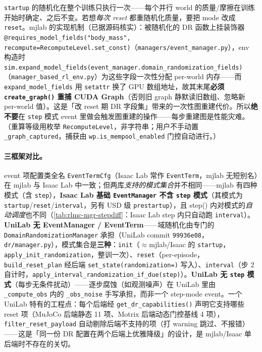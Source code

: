 \begin{insight}\label{ins:rlmc-mgr-startup}
\verb|startup| 的随机化在整个训练只执行一次——每个并行 world 的质量/摩擦在训练开始时确定、之后不变。若想\emph{每次 reset} 都重随机化质量，要把 mode 改成 \verb|reset|。mjlab 的实现机制（已据源码核实）：被随机化的 DR 函数上挂装饰器 \verb|@requires_model_fields("body_mass", recompute=RecomputeLevel.set_const)|（\texttt{managers/event\_manager.py}），env 构造时 \verb|sim.expand_model_fields(event_manager.domain_randomization_fields)|（\texttt{manager\_based\_rl\_env.py}）为这些字段一次性分配 per-world 内存——而 \verb|expand_model_fields| 用 \verb|setattr| 换了 GPU 数组地址，故其末尾\textbf{必须 \texttt{create\_graph()} 重捕 CUDA Graph}（否则旧 graph 静默读旧数组、忽略新 per-world 值）。这是「改 reset 期 DR 字段集」带来的一次性图重建代价。所以\textbf{绝不要}在 \verb|step| 模式 event 里做会触发图重建的操作——每步重建图是性能灾难。（重算等级用枚举 \verb|RecomputeLevel|，非字符串；用户不手动置 \verb|_graph_captured|，捕获由 \verb|wp.is_mempool_enabled| 门控自动进行。）
\end{insight}

\paragraph{三框架对比。}event 项配置类全名 \verb|EventTermCfg|（Isaac Lab 常作 \verb|EventTerm|，mjlab 无短别名）在 mjlab 与 Isaac Lab 中一致；但两库\emph{支持的模式集合}并不相同——mjlab 有四种模式（含 \verb|step|），\textbf{Isaac Lab 基础 \texttt{EventManager} 不含 \texttt{step} 模式}（其模式为 \verb|startup|/\verb|reset|/\verb|interval|，另有 USD 级 \verb|prestartup|），且 step() 内对模式的\emph{自动调度}也不同（\cref{tab:rlmc-mgr-stepdiff}：Isaac Lab step 内只自动跑 \verb|interval|）。\textbf{UniLab 无 EventManager / EventTerm}——域随机化由专门的 \verb|DomainRandomizationManager| 承担（UniLab commit \texttt{99936e08}，\texttt{dr/manager.py}），模式集合是\textbf{三种}：\verb|init|（$\approx$mjlab/Isaac 的 \verb|startup|，\verb|apply_init_randomization|，整训一次）、\verb|reset|（per-episode，\verb|build_reset_plan| 经后端 \verb|set_state(randomization=)| 写入）、\verb|interval|（步 2 自计时，\verb|apply_interval_randomization_if_due(step)|）。\textbf{UniLab 无 \texttt{step} 模式}（每步无条件扰动）——逐步腐蚀（如观测噪声）在 UniLab 里由 \verb|_compute_obs| 内的 \verb|_obs_noise| 手写承担，而非一个 step-mode event。一个 UniLab 特有的工程点：每个后端经 \verb|get_dr_capabilities()| 声明它支持哪些 reset 项（MuJoCo 后端静态 11 项、Motrix 后端动态门控基线 4 项），\verb|filter_reset_payload| 自动剔除后端不支持的项（打 warning 跳过、不报错）——这是「同一份 DR 配置在两个后端上优雅降级」的设计，是 mjlab/Isaac 单后端时不存在的关切。

